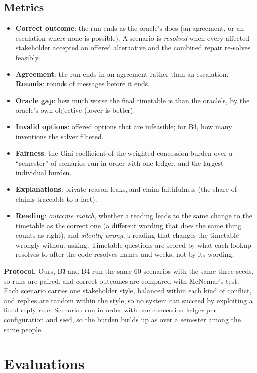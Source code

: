 \documentclass[11pt,a4paper]{article}
\begin{document}
\subsection{Metrics}
\begin{itemize}
\item \textbf{Correct outcome}: the run ends as the oracle's does (an agreement, or an escalation where none is
possible). A scenario is \emph{resolved} when every affected stakeholder accepted an offered alternative and the
combined repair re-solves feasibly.
\item \textbf{Agreement}: the run ends in an agreement rather than an escalation. \textbf{Rounds}: rounds of messages
before it ends.
\item \textbf{Oracle gap}: how much worse the final timetable is than the oracle's, by the oracle's own objective
(lower is better).
\item \textbf{Invalid options}: offered options that are infeasible; for B4, how many inventions the solver filtered.
\item \textbf{Fairness}: the Gini coefficient of the weighted concession burden over a ``semester'' of scenarios run
in order with one ledger, and the largest individual burden.
\item \textbf{Explanations}: private-reason leaks, and claim faithfulness (the share of claims traceable to a fact).
\item \textbf{Reading}: \emph{outcome match}, whether a reading leads to the same change to the timetable as the
correct one (a different wording that does the same thing counts as right), and \emph{silently wrong}, a reading
that changes the timetable wrongly without asking. Timetable questions are scored by what each lookup resolves to
after the code resolves names and weeks, not by its wording.
\end{itemize}

\noindent\textbf{Protocol.} Ours, B3 and B4 run the same 60 scenarios with the same three seeds, so runs are paired,
and correct outcomes are compared with McNemar's test. Each scenario carries one stakeholder style, balanced within
each kind of conflict, and replies are random within the style, so no system can succeed by exploiting a fixed reply
rule. Scenarios run in order with one concession ledger per configuration and seed, so the burden builds up as over a
semester among the same people.

\section{Evaluations}
\label{sec:eval}
\end{document}
